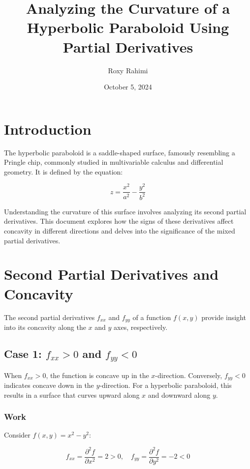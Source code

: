 \documentclass{article}
\begin{document}
\title{Analyzing the Curvature of a Hyperbolic Paraboloid Using Partial Derivatives}
\author{Roxy Rahimi}
\date{October 5, 2024}

\maketitle

\section*{Introduction}

The hyperbolic paraboloid is a saddle-shaped surface, famously resembling a Pringle chip, commonly studied in multivariable calculus and differential geometry. It is defined by the equation:

\[
z = \frac{x^2}{a^2} - \frac{y^2}{b^2}
\]

Understanding the curvature of this surface involves analyzing its second partial derivatives. This document explores how the signs of these derivatives affect concavity in different directions and delves into the significance of the mixed partial derivatives.

\section{Second Partial Derivatives and Concavity}

The second partial derivatives \( f_{xx} \) and \( f_{yy} \) of a function \( f(x, y) \) provide insight into its concavity along the \( x \) and \( y \) axes, respectively.

\subsection{Case 1: \( f_{xx} > 0 \) and \( f_{yy} < 0 \)}

When \( f_{xx} > 0 \), the function is concave up in the \( x \)-direction. Conversely, \( f_{yy} < 0 \) indicates concave down in the \( y \)-direction. For a hyperbolic paraboloid, this results in a surface that curves upward along \( x \) and downward along \( y \).

\subsubsection*{Work}

Consider \( f(x, y) = x^2 - y^2 \):

\[
f_{xx} = \frac{\partial^2 f}{\partial x^2} = 2 > 0, \quad f_{yy} = \frac{\partial^2 f}{\partial y^2} = -2 < 0
\]
\end{document}
